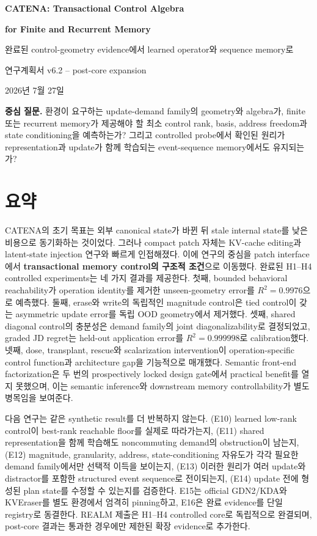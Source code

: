 \documentclass[10.3pt,a4paper]{article}
\begin{document}
\begin{center}
{\LARGE\bfseries CATENA: Transactional Control Algebra}\par{\LARGE\bfseries for Finite and Recurrent Memory}\par\vspace{3mm}
{\large 완료된 control-geometry evidence에서 learned operator와 sequence memory로}\par\vspace{4mm}
{\normalsize 연구계획서 v6.2 -- post-core expansion}\par\vspace{2mm}
{\small 2026년 7월 27일}
\end{center}

\begin{keybox}
\textbf{중심 질문.} 환경이 요구하는 update-demand family의 geometry와 algebra가, finite 또는 recurrent memory가 제공해야 할 최소 control rank, basis, address freedom과 state conditioning을 예측하는가? 그리고 controlled probe에서 확인된 원리가 representation과 update가 함께 학습되는 event-sequence memory에서도 유지되는가?
\end{keybox}

\section*{요약}
CATENA의 초기 목표는 외부 canonical state가 바뀐 뒤 stale internal state를 낮은 비용으로 동기화하는 것이었다. 그러나 compact patch 자체는 KV-cache editing과 latent-state injection 연구와 빠르게 인접해졌다\citep{kveraser2026}. 이에 연구의 중심을 patch interface에서 \textbf{transactional memory control의 구조적 조건}으로 이동했다. 완료된 H1--H4 controlled experiments는 네 가지 결과를 제공한다. 첫째, bounded behavioral reachability가 operation identity를 제거한 unseen-geometry error를 $R^2=0.9976$으로 예측했다. 둘째, erase와 write의 독립적인 magnitude control은 tied control이 갖는 asymmetric update error를 독립 OOD geometry에서 제거했다. 셋째, shared diagonal control의 충분성은 demand family의 joint diagonalizability로 결정되었고, graded JD regret는 held-out application error를 $R^2=0.999998$로 calibration했다. 넷째, dose, transplant, rescue와 scalarization intervention이 operation-specific control function과 architecture gap을 기능적으로 매개했다. Semantic front-end factorization은 두 번의 prospectively locked design gate에서 practical benefit를 열지 못했으며, 이는 semantic inference와 downstream memory controllability가 별도 병목임을 보여준다.

다음 연구는 같은 synthetic result를 더 반복하지 않는다. (E10) learned low-rank control이 best-rank reachable floor를 실제로 따라가는지, (E11) shared representation을 함께 학습해도 noncommuting demand의 obstruction이 남는지, (E12) magnitude, granularity, address, state-conditioning 자유도가 각각 필요한 demand family에서만 선택적 이득을 보이는지, (E13) 이러한 원리가 여러 update와 distractor를 포함한 structured event sequence로 전이되는지, (E14) update 전에 형성된 plan state를 수정할 수 있는지를 검증한다. E15는 official GDN2/KDA와 KVEraser를 별도 환경에서 엄격히 pinning하고, E16은 완료 evidence를 단일 registry로 동결한다. REALM 제출은 H1--H4 controlled core로 독립적으로 완결되며, post-core 결과는 통과한 경우에만 제한된 확장 evidence로 추가한다.
\end{document}
